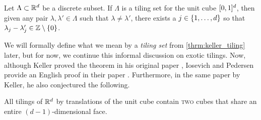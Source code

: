 \documentclass[../thesis.tex]{subfiles}
\begin{document}
\begin{theorem}\label{thrm:keller_tiling}
    Let $\Lambda \subset \mathbb{R}^d$ be a discrete subset. If $\Lambda$ is a tiling set for the unit cube $[0,1]^d$, then given any pair $\lambda, \lambda' \in \Lambda$ such that $\lambda\neq\lambda'$, there exists a $j\in \{1,\dots,d\}$ so that $\lambda_j-\lambda_j' \in \mathbb{Z}\setminus\{0\}$.
\end{theorem}

We will formally define what we mean by a \emph{tiling set} from \cref{thrm:keller_tiling} later, but for now, we continue this informal discussion on exotic tilings. Now, although Keller proved the theorem in his original paper \cite{kellerUberLuckenloseErfullung1930}, Iosevich and Pedersen provide an English proof in their paper \cite{iosevichSpectralTilingProperties1998}. Furthermore, in the same paper by Keller, he also conjectured the following. 

\begin{conjecture}\label{conj:keller_tiling}
    All tilings of $\mathbb{R}^d$ by translations of the unit cube contain \textsc{two} cubes that share an entire $(d-1)$-dimensional face.
\end{conjecture}  %


\end{document}
